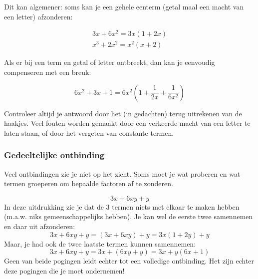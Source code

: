 Dit kan algemener: soms kan je een gehele eenterm (getal maal een macht van een letter) afzonderen:

\begin{voorbeeld}
	\begin{eqnarray*}
		3x+6x^2=3x(1+2x) \\
		x^3+2x^2=x^2(x+2)
	\end{eqnarray*}
\end{voorbeeld}

Als er bij een term en getal of letter ontbreekt, dan kan je eenvoudig compenseren met een breuk:

\begin{voorbeeld}
	\begin{equation*}
	6x^2+3x+1=6x^2(1+\frac{1}{2x}+\frac{1}{6x^2})
	\end{equation*}
\end{voorbeeld}

Controleer altijd je antwoord door het (in gedachten) terug uitrekenen van de haakjes. Veel fouten worden gemaakt door een verkeerde macht van een letter te laten staan, of door het vergeten van constante termen.

\subsubsection{Gedeeltelijke ontbinding}
Veel ontbindingen zie je niet op het zicht. Soms moet je wat proberen en wat termen groeperen om bepaalde factoren af te zonderen. 
\begin{voorbeeld}
	
\begin{equation*}
3x+6xy+y
\end{equation*}
In deze uitdrukking zie je dat de 3 termen niets met elkaar te maken hebben (m.a.w. niks gemeenschappelijks hebben). Je kan wel de eerste twee samennemen en daar  uit afzonderen:
\begin{equation*}
3x+6xy+y = (3x+6xy)+y = 3x(1+2y)+y
\end{equation*}
Maar, je had ook de twee laatste termen kunnen samennemen:
\begin{equation*}
3x+6xy+y = 3x+(6xy+y) = 3x+y(6x+1)
\end{equation*}
Geen van beide pogingen leidt echter tot een volledige ontbinding. Het zijn echter deze pogingen die je moet ondernemen!

\end{voorbeeld}
